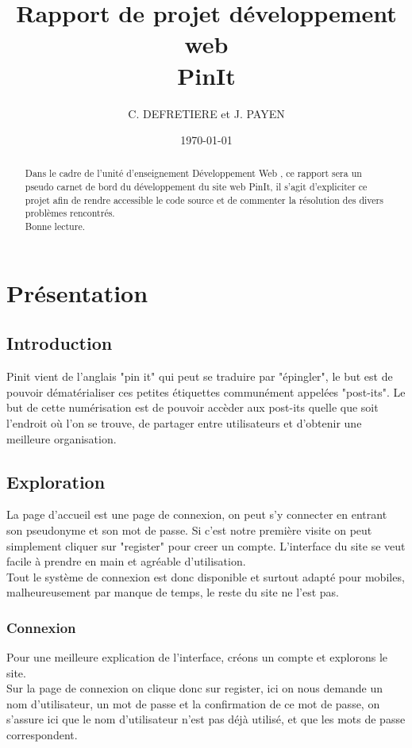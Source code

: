 \documentclass[a4paper, 11pt]{article}
\title{Rapport de projet développement web \\ \og PinIt \fg}
\author{C. DEFRETIERE et J. PAYEN}
\date{\today}
\begin{document}
\maketitle

\begin{abstract}
Dans le cadre de l'unité d'enseignement \og Développement Web \fg , ce rapport sera un pseudo
carnet de bord du développement du site web PinIt, il s'agit d'expliciter ce projet afin de rendre
accessible le code source et de commenter la résolution des divers problèmes rencontrés.
\\

Bonne lecture.
\end{abstract}

\newpage

\tableofcontents

\newpage

\section{Présentation}

\subsection{Introduction}
Pinit vient de l'anglais "pin it" qui peut se traduire par "épingler", le but est de pouvoir
dématérialiser ces petites étiquettes communément appelées "post-its". Le but de cette numérisation est
de pouvoir accèder aux post-its quelle que soit l'endroit où l'on se trouve, de partager entre
utilisateurs et d'obtenir une meilleure organisation.

\subsection{Exploration}

La page d'accueil est une page de connexion, on peut s'y connecter en entrant son pseudonyme et
son mot de passe. Si c'est notre première visite on peut simplement cliquer sur "register" pour creer 
un compte. L'interface du site se veut facile à prendre en main et agréable d'utilisation.
\\
Tout le système de connexion est donc disponible et surtout adapté pour mobiles, malheureusement par 
manque de temps, le reste du site ne l'est pas.

\subsubsection{Connexion}
Pour une meilleure explication de l'interface, créons un compte et explorons le site.
\\
Sur la page de connexion on clique donc sur register, ici on nous demande un nom d'utilisateur, un mot de 
passe et la confirmation de ce mot de passe, on s'assure ici que le nom d'utilisateur n'est pas déjà utilisé,
et que les mots de passe correspondent.
\end{document}
